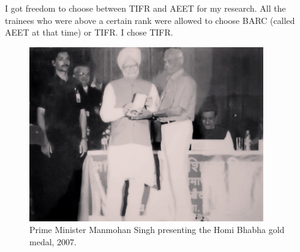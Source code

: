 I got freedom to choose between TIFR and AEET for my research. All the 
trainees who were above a certain rank were allo\-wed to choose BARC 
(called AEET at that time) or TIFR. I chose TIFR.
\newpage

\vspace{-\topsep}
\begin{figure}[H]
\centering
\includegraphics[width=0.9\textwidth]{images/Rajaji-04.jpg}
\caption{\small{Prime Minister Manmohan Singh presenting the Homi Bhabha
gold medal, 2007.}}
\end{figure}

